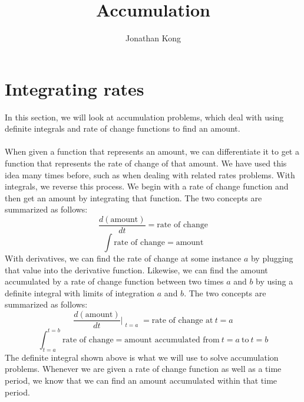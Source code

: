 \documentclass[11pt]{scrartcl}
\title{Accumulation}
\author{Jonathan Kong}
\date{}
\begin{document}
\maketitle
\noindent 

\section{Integrating rates}
\noindent
In this section, we will look at accumulation problems, which deal with using definite integrals and rate of change functions to find an amount. \\
\\
\noindent 
When given a function that represents an amount, we can differentiate it to get a function that represents the rate of change of that amount. We have used this idea many times before, such as when dealing with related rates problems. With integrals, we reverse this process. We begin with a rate of change function and then get an amount by integrating that function. The two concepts are summarized as follows: 
$$\frac{d(\text{amount})}{dt}=\text{rate of change}$$
$$\int{\text{rate of change}}=\text{amount}$$
\noindent 
With derivatives, we can find the rate of change at some instance $a$ by plugging that value into the derivative function. Likewise, we can find the amount accumulated by a rate of change function between two times $a$ and $b$ by using a definite integral with limits of integration $a$ and $b$. The two concepts are summarized as follows: 
$$\frac{d(\text{amount})}{dt}\Bigr|_{\substack{t=a}}=\text{rate of change at} \ t=a$$
$$\int_{t=a}^{t=b}{\text{rate of change}}=\text{amount accumulated from} \ t=a \ \text{to} \ t=b$$
\noindent 
The definite integral shown above is what we will use to solve accumulation problems. Whenever we are given a rate of change function as well as a time period, we know that we can find an amount accumulated within that time period. 
\end{document}
